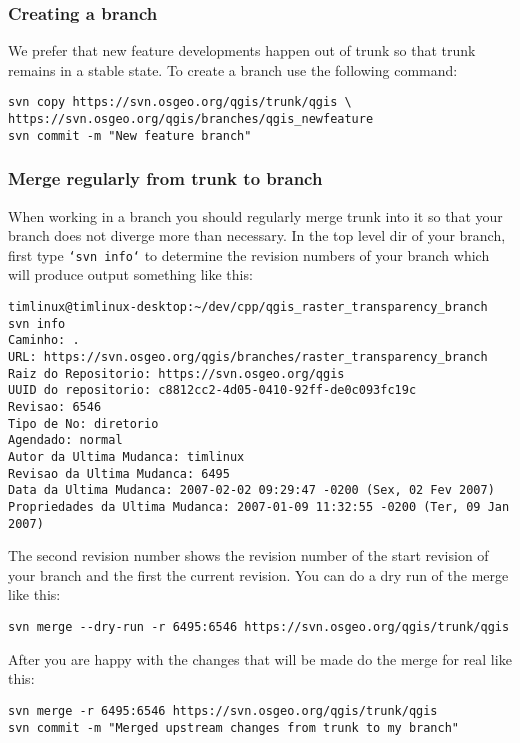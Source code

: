 \hypertarget{toc37}{}
\subsubsection{Creating a branch}
We prefer that new feature developments happen out of trunk so that trunk
remains in a stable state. To create a branch use the following command:

\begin{verbatim}
svn copy https://svn.osgeo.org/qgis/trunk/qgis \
https://svn.osgeo.org/qgis/branches/qgis_newfeature
svn commit -m "New feature branch"
\end{verbatim}

\hypertarget{toc38}{}
\subsubsection{Merge regularly from trunk to branch}
When working in a branch you should regularly merge trunk into it so that your
branch does not diverge more than necessary. In the top level dir of your
branch, first type \texttt{`svn info`} to determine the revision numbers of your
branch which will produce output something like this:

\begin{verbatim}
timlinux@timlinux-desktop:~/dev/cpp/qgis_raster_transparency_branch svn info
Caminho: .
URL: https://svn.osgeo.org/qgis/branches/raster_transparency_branch
Raiz do Repositorio: https://svn.osgeo.org/qgis
UUID do repositorio: c8812cc2-4d05-0410-92ff-de0c093fc19c
Revisao: 6546
Tipo de No: diretorio
Agendado: normal
Autor da Ultima Mudanca: timlinux
Revisao da Ultima Mudanca: 6495
Data da Ultima Mudanca: 2007-02-02 09:29:47 -0200 (Sex, 02 Fev 2007)
Propriedades da Ultima Mudanca: 2007-01-09 11:32:55 -0200 (Ter, 09 Jan 2007)
\end{verbatim}

The second revision number shows the revision number of the start revision of
your branch and the first the current revision. You can do a dry run of the
merge like this:

\begin{verbatim}
svn merge --dry-run -r 6495:6546 https://svn.osgeo.org/qgis/trunk/qgis
\end{verbatim}

After you are happy with the changes that will be made do the merge for real
like this:

\begin{verbatim}
svn merge -r 6495:6546 https://svn.osgeo.org/qgis/trunk/qgis
svn commit -m "Merged upstream changes from trunk to my branch"
\end{verbatim}


